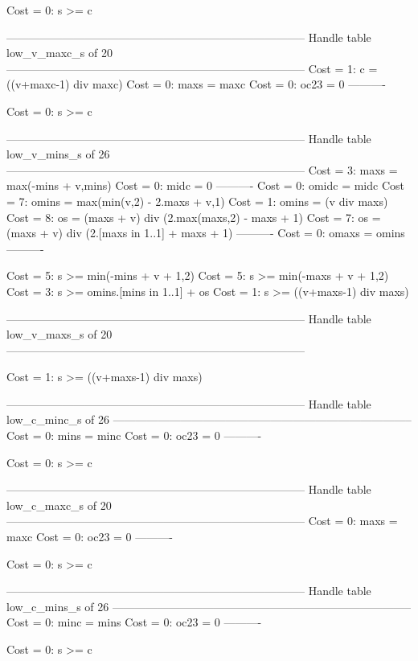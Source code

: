 Cost =  0:  s >= c

--------------------------------------------------------------------------------
Handle table low_v_maxc_s of 20
--------------------------------------------------------------------------------
Cost =  1:  c    = ((v+maxc-1) div maxc)
Cost =  0:  maxs = maxc
Cost =  0:  oc23 = 0
----------

Cost =  0:  s >= c

--------------------------------------------------------------------------------
Handle table low_v_mins_s of 26
--------------------------------------------------------------------------------
Cost =  3:  maxs  = max(-mins + v,mins)
Cost =  0:  midc  = 0
----------
Cost =  0:  omidc = midc
Cost =  7:  omins = max(min(v,2) - 2.maxs + v,1)
Cost =  1:  omins = (v div maxs)
Cost =  8:  os    = (maxs + v) div (2.max(maxs,2) - maxs + 1)
Cost =  7:  os    = (maxs + v) div (2.[maxs in 1..1] + maxs + 1)
----------
Cost =  0:  omaxs = omins
----------

Cost =  5:  s >= min(-mins + v + 1,2)
Cost =  5:  s >= min(-maxs + v + 1,2)
Cost =  3:  s >= omins.[mins in 1..1] + os
Cost =  1:  s >= ((v+maxs-1) div maxs)

--------------------------------------------------------------------------------
Handle table low_v_maxs_s of 20
--------------------------------------------------------------------------------

Cost =  1:  s >= ((v+maxs-1) div maxs)

--------------------------------------------------------------------------------
Handle table low_c_minc_s of 26
--------------------------------------------------------------------------------
Cost =  0:  mins = minc
Cost =  0:  oc23 = 0
----------

Cost =  0:  s >= c

--------------------------------------------------------------------------------
Handle table low_c_maxc_s of 20
--------------------------------------------------------------------------------
Cost =  0:  maxs = maxc
Cost =  0:  oc23 = 0
----------

Cost =  0:  s >= c

--------------------------------------------------------------------------------
Handle table low_c_mins_s of 26
--------------------------------------------------------------------------------
Cost =  0:  minc = mins
Cost =  0:  oc23 = 0
----------

Cost =  0:  s >= c

